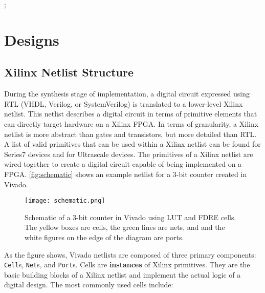 ;%
\newpage
\section{Designs}

\subsection{Xilinx Netlist Structure} \label{sec:xilinxNetlist}
During the synthesis stage of implementation, a digital circuit expressed using
RTL (VHDL, Verilog, or SystemVerilog) is translated to a lower-level Xilinx
netlist. This netlist describes a digital circuit in terms of primitive elements
that can directly target hardware on a Xilinx FPGA. In terms of granularity, a
Xilinx netlist is more abstract than gates and transistors, but more detailed
than RTL. A list of valid primitives that can be used within a Xilinx netlist
can be found
\href{http://www.xilinx.com/support/documentation/sw_manuals/xilinx2016_2/ug953-vivado-7series-libraries.pdf}{\color{blue}{here}}
for Series7 devices and
\href{http://www.xilinx.com/support/documentation/sw_manuals/xilinx2014_1/ug974-vivado-ultrascale-libraries.pdf}{\color{blue}{here}}
for Ultrascale devices. The primitives of a Xilinx netlist are wired together to
create a digital circuit capable of being implemented on a FPGA.
\autoref{fig:schematic} shows an example netlist for a 3-bit counter created in Vivado.

\begin{figure}[h!]
 \centering
 \texttt{[image: schematic.png]}
 \caption{Schematic of a 3-bit counter in Vivado using LUT and FDRE cells.
 The yellow boxes are cells, the green lines are nets, and and the
 white figures on the edge of the diagram are ports.}
 \label{fig:schematic}
\end{figure}

As the figure shows, Vivado netlists are composed of three primary components:
\texttt{Cell}s, \texttt{Net}s, and \texttt{Port}s. Cells are \textbf{instances} of
Xilinx primitives. They are the basic building blocks of a Xilinx netlist and
implement the actual logic of a digital design. The most commonly used
cells include:

